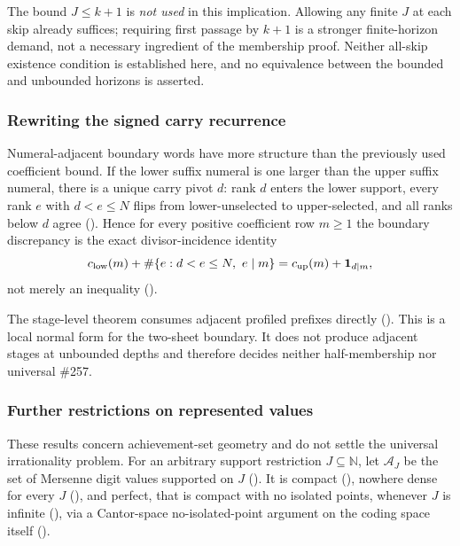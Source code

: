The bound $J\le k+1$ is \emph{not used} in this implication.
Allowing any finite $J$ at each skip already suffices; requiring
first passage by $k+1$ is a stronger finite-horizon demand, not a
necessary ingredient of the membership proof.  Neither all-skip
existence condition is established here, and no equivalence between
the bounded and unbounded horizons is asserted.

\subsubsection{Rewriting the signed carry recurrence}

Numeral-adjacent boundary words have more structure than the previously used
coefficient bound.  If the lower suffix numeral is one larger than the upper
suffix numeral, there is a unique carry pivot $d$: rank $d$ enters the lower
support, every rank $e$ with $d<e\le N$ flips from lower-unselected to
upper-selected, and all ranks below $d$ agree
().
Hence for
every positive coefficient row $m\ge1$ the boundary discrepancy is the exact divisor-incidence
identity
\[
 c_{\rm low}(m)+\#\{e:d<e\le N,\ e\mid m\}
 =c_{\rm up}(m)+\mathbf 1_{d\mid m},
\]
not merely an inequality
().

The stage-level theorem consumes adjacent profiled prefixes directly
().
This is a local normal form for the two-sheet boundary.  It does
not produce adjacent stages at unbounded depths and therefore decides neither
half-membership nor universal \#257.

\subsubsection{Further restrictions on represented values}

These results concern achievement-set geometry and do not settle the universal
irrationality problem.  For an arbitrary support restriction $J\subseteq\mathbb{N}$, let
$\mathcal A_J$ be the set of Mersenne digit values supported on $J$
(). It is compact
(),
nowhere dense for every $J$ (),
and perfect, that is compact with no isolated points, whenever $J$ is infinite
(), via a
Cantor-space no-isolated-point argument on the coding space itself
().

